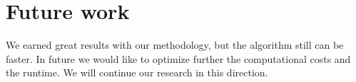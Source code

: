 \documentclass{article}
\begin{document}
\section{Future work}

We earned great results with our methodology, but the algorithm still can be faster.
In future we would like to optimize further the computational costs and the runtime.
We will continue our research in this direction.
\end{document}
